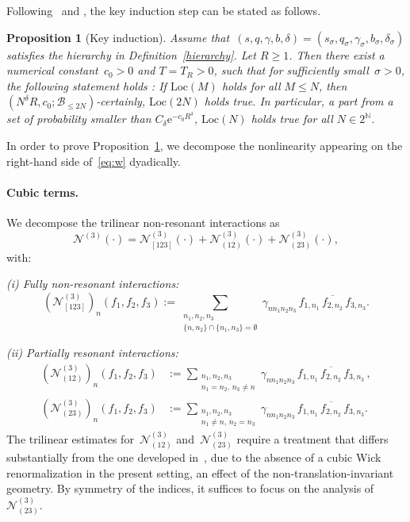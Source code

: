 \documentclass[11pt,reqno,english]{amsart}
\numberwithin{equation}{section}
\theoremstyle{plain}
\newtheorem{proposition}[theorem]{Proposition}
\theoremstyle{definition}
\theoremstyle{remark}
\newcommand{\N}{\mathbb{N}}
\newcommand{\e}{\mathrm{e}}
\begin{document}
Following~\cite{BCST24} and \cite{DNY24}, the key induction step can be stated as follows.
\begin{proposition}[Key induction]\label{prop:key}
	Assume that~$(s,q,\gamma,b,\delta)=(s_{\sigma},q_{\sigma},\gamma_{\sigma},b_{\sigma},\delta_{\sigma})$ satisfies the hierarchy in Definition~\ref{hierarchy}. Let $R\geq 1$.
	Then there exist a numerical constant~$c_0>0$ and $T=T_R>0$, such that for sufficiently small~$\sigma>0$, the following statement holds : If $\mathrm{Loc}(M)$ holds for all $M\leq N$,  then~$(N^{\delta}R,c_0;\mathcal{B}_{\leq 2N})$-certainly, $\mathrm{Loc}(2N)$ holds true. In particular, a part from a set of probability smaller than $C_{\delta}\e^{-c_0R^{\delta}}$, $\mathrm{Loc}(N)$ holds true for all $N\in 2^{\N}$.
\end{proposition}
	
In order to prove Proposition~\ref{prop:key}, we decompose the nonlinearity appearing on the right-hand side of~\eqref{eq:w} dyadically.
	\medskip
	

\paragraph{\bf Cubic terms.}
We decompose the trilinear non-resonant interactions as
\[
\mathcal{N}^{(3)}(\cdot)
=\mathcal{N}_{[123]}^{(3)}(\cdot)
+\mathcal{N}_{(12)}^{(3)}(\cdot)
+\mathcal{N}_{(23)}^{(3)}(\cdot),
\]
with:

\emph{(i) Fully non-resonant interactions:}
\begin{equation}
	\label{def:N^3(123)}
	(\mathcal{N}_{[123]}^{(3)})_n(f_1,f_2,f_3)
	:=\sum_{\substack{n_1,n_2,n_3\\
			\{n,n_2\}\cap\{n_1,n_3\}=\emptyset}}
	\gamma_{nn_1n_2n_3}\,
	f_{1,n_1}\,\overline{f_{2,n_2}}\,f_{3,n_3}.
\end{equation}

\emph{(ii) Partially resonant interactions:}
\begin{align}
	\label{def:N^3(12)}
	(\mathcal{N}_{(12)}^{(3)})_n(f_1,f_2,f_3)
	&:=\sum_{\substack{n_1,n_2,n_3\\
			n_1=n_2,\, n_3\neq n}}
	\gamma_{nn_1n_2n_3}\,
	f_{1,n_1}\,\overline{f_{2,n_2}}\,f_{3,n_3}\,,
	\\
	\label{def:N^3(23)}
	(\mathcal{N}_{(23)}^{(3)})_n(f_1,f_2,f_3)
	&:=\sum_{\substack{n_1,n_2,n_3\\
			n_1\neq n,\, n_2=n_3}}
	\gamma_{nn_1n_2n_3}\,
	f_{1,n_1}\,\overline{f_{2,n_2}}\,f_{3,n_3}.
\end{align}
The trilinear estimates for~$\mathcal{N}_{(12)}^{(3)}$ and~$\mathcal{N}_{(23)}^{(3)}$ require a treatment that differs substantially from the one developed in~\cite{BCST24}, due to the absence of a cubic Wick renormalization in the present setting, an effect of the non-translation-invariant geometry.
By symmetry of the indices, it suffices to focus on the analysis of~$\mathcal{N}_{(23)}^{(3)}$.
\end{document}
